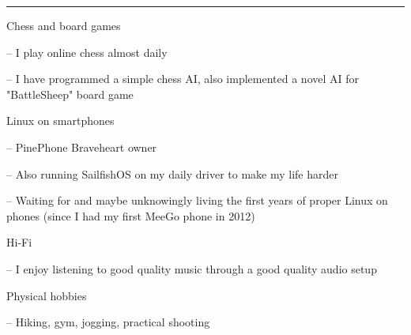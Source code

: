 \documentclass[a4paper,hidelinks,10pt]{article}
\newlength{\cvcolumngapwidth}
\newlength{\cvleftcolumnwidth}
\newlength{\cvrightcolumnwidth}
\newcommand{\cvsectionstyle}[1]{{\normalsize\cvsectionfont\textcolor{cvsectioncolor}{#1}}}
\newcommand{\cvheadingstyle}[1]{{\normalsize\cvheadingfont\textcolor{cvheadingcolor}{#1}}}
\newlength{\cvafteritemskipamount}
\newlength{\cvaftersectionskipamount}
\newlength{\cvbetweensectionandheadingextraskipamount}
\newlength{\cvparskip}
\newcommand{\cvsection}[1]{
    \begin{minipage}[t]{\cvleftcolumnwidth}
        \raggedleft\cvsectionstyle{#1}
    \end{minipage}%
    \hspace{\cvcolumngapwidth}%
    \begin{minipage}[t]{\cvrightcolumnwidth}
        \textcolor{cvrulecolor}{\rule{\cvrightcolumnwidth}{0.3mm}}
    \end{minipage}

    \vspace{\cvaftersectionskipamount}
}
\newcommand{\cvitem}[2]{
    \begin{minipage}[t]{\cvleftcolumnwidth}
        \raggedleft #1
    \end{minipage}%
    \hspace{\cvcolumngapwidth}%
    \begin{minipage}[t]{\cvrightcolumnwidth}
        \setlength{\parskip}{\cvparskip} #2
    \end{minipage}

    \vspace{\cvafteritemskipamount}
}
\begin{document}

\cvsection{PERSONAL INTERESTS}

\vspace{\cvbetweensectionandheadingextraskipamount}


\cvitem{
    \cvheadingstyle{Chess and board games}
}{
    -- I play online chess almost daily

    -- I have programmed a simple chess AI, also implemented a novel AI for "BattleSheep" board game
    
}


\cvitem{
    \cvheadingstyle{Linux on smartphones}
}{

    -- PinePhone Braveheart owner
    
    -- Also running SailfishOS on my daily driver to make my life harder
    
    -- Waiting for and maybe unknowingly living the first years of proper Linux on phones (since I had my first MeeGo phone in 2012)
    
}


\cvitem{
    \cvheadingstyle{Hi-Fi}
}{
    -- I enjoy listening to good quality music through a good quality audio setup
}


\cvitem{
    \cvheadingstyle{Physical hobbies}
}{
    -- Hiking, gym, jogging, practical shooting
}
\end{document}
